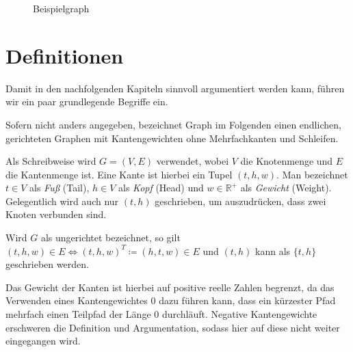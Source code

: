 \begin{figure}[ht]
    \caption{Beispielgraph}
    \label{graphs:fig:beispielgraph}
\end{figure}

\section{Definitionen}
Damit in den nachfolgenden Kapiteln sinnvoll argumentiert werden kann, führen wir ein paar grundlegende Begriffe ein.

\begin{definition}[Graph]
    Sofern nicht anders angegeben, bezeichnet Graph im Folgenden einen endlichen, gerichteten Graphen mit Kantengewichten ohne Mehrfachkanten und Schleifen.

    Als Schreibweise wird $G = (V, E)$ verwendet, wobei $V$ die Knotenmenge und $E$ die Kantenmenge ist. Eine Kante ist hierbei ein Tupel $(t, h, w)$. Man bezeichnet $t \in V$ als \emph{Fuß} (Tail), $h \in V$ als \emph{Kopf} (Head) und $w \in \mathbb{R}^+$ als \emph{Gewicht} (Weight). Gelegentlich wird auch nur $(t, h)$ geschrieben, um auszudrücken, dass zwei Knoten verbunden sind.

    Wird $G$ als ungerichtet bezeichnet, so gilt $(t, h, w) \in E \Leftrightarrow (t, h, w)^T \coloneq (h, t, w) \in E$ und $(t, h)$ kann als $\{ t, h \}$ geschrieben werden.
\end{definition}

Das Gewicht der Kanten ist hierbei auf positive reelle Zahlen begrenzt, da das Verwenden eines Kantengewichtes $0$ dazu führen kann, dass ein kürzester Pfad mehrfach einen Teilpfad der Länge 0 durchläuft.
Negative Kantengewichte erschweren die Definition und Argumentation, sodass hier auf diese nicht weiter eingegangen wird.

